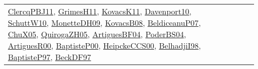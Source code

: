 {\begin{longtable}{lp{3cm}>{\raggedright}p{6cm}>{\raggedright}p{6cm}p{8cm}}
\href{papers/ClercqPBJ11.pdf}{ClercqPBJ11}\cite{ClercqPBJ11}, \href{papers/GrimesH11.pdf}{GrimesH11}\cite{GrimesH11}, \href{articles/KovacsK11.pdf}{KovacsK11}\cite{KovacsK11}, \href{papers/Davenport10.pdf}{Davenport10}\cite{Davenport10}, \href{papers/SchuttW10.pdf}{SchuttW10}\cite{SchuttW10}, \href{papers/MonetteDH09.pdf}{MonetteDH09}\cite{MonetteDH09}, \href{articles/KovacsB08.pdf}{KovacsB08}\cite{KovacsB08}, \href{papers/BeldiceanuP07.pdf}{BeldiceanuP07}\cite{BeldiceanuP07}, \href{papers/ChuX05.pdf}{ChuX05}\cite{ChuX05}, \href{papers/QuirogaZH05.pdf}{QuirogaZH05}\cite{QuirogaZH05}, \href{papers/ArtiguesBF04.pdf}{ArtiguesBF04}\cite{ArtiguesBF04}, \href{articles/PoderBS04.pdf}{PoderBS04}\cite{PoderBS04}, \href{articles/ArtiguesR00.pdf}{ArtiguesR00}\cite{ArtiguesR00}, \href{articles/BaptisteP00.pdf}{BaptisteP00}\cite{BaptisteP00}, \href{articles/HeipckeCCS00.pdf}{HeipckeCCS00}\cite{HeipckeCCS00}, \href{articles/BelhadjiI98.pdf}{BelhadjiI98}\cite{BelhadjiI98}, \href{papers/BaptisteP97.pdf}{BaptisteP97}\cite{BaptisteP97}, \href{papers/BeckDF97.pdf}{BeckDF97}\cite{BeckDF97}\\

\end{longtable}}
